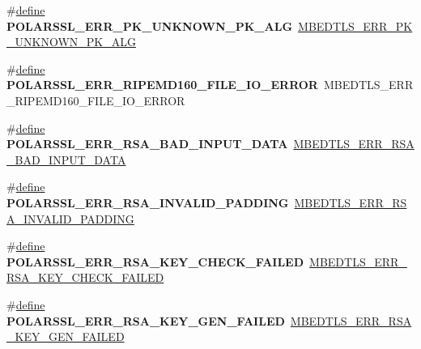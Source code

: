 \begin{DoxyCompactItemize}
\#\hyperlink{structdefine}{define} {\bfseries P\+O\+L\+A\+R\+S\+S\+L\+\_\+\+E\+R\+R\+\_\+\+P\+K\+\_\+\+U\+N\+K\+N\+O\+W\+N\+\_\+\+P\+K\+\_\+\+A\+LG}~\hyperlink{pk_8h_a877b66447bfa2cd49c1b99f1dc887568}{M\+B\+E\+D\+T\+L\+S\+\_\+\+E\+R\+R\+\_\+\+P\+K\+\_\+\+U\+N\+K\+N\+O\+W\+N\+\_\+\+P\+K\+\_\+\+A\+LG}
\item 
\mbox{\label{compat-1_83_8h_a72705f38972166097c2c3c8477baf950}} 
\#\hyperlink{structdefine}{define} {\bfseries P\+O\+L\+A\+R\+S\+S\+L\+\_\+\+E\+R\+R\+\_\+\+R\+I\+P\+E\+M\+D160\+\_\+\+F\+I\+L\+E\+\_\+\+I\+O\+\_\+\+E\+R\+R\+OR}~M\+B\+E\+D\+T\+L\+S\+\_\+\+E\+R\+R\+\_\+\+R\+I\+P\+E\+M\+D160\+\_\+\+F\+I\+L\+E\+\_\+\+I\+O\+\_\+\+E\+R\+R\+OR
\item 
\mbox{\label{compat-1_83_8h_aa30403951a6242045d0b47e2b51eccb0}} 
\#\hyperlink{structdefine}{define} {\bfseries P\+O\+L\+A\+R\+S\+S\+L\+\_\+\+E\+R\+R\+\_\+\+R\+S\+A\+\_\+\+B\+A\+D\+\_\+\+I\+N\+P\+U\+T\+\_\+\+D\+A\+TA}~\hyperlink{rsa_8h_abf2997e01281b898fd4594af0b7bfbb4}{M\+B\+E\+D\+T\+L\+S\+\_\+\+E\+R\+R\+\_\+\+R\+S\+A\+\_\+\+B\+A\+D\+\_\+\+I\+N\+P\+U\+T\+\_\+\+D\+A\+TA}
\item 
\mbox{\label{compat-1_83_8h_a2cab7b3c4ddc3bc02ffc59db19d0400f}} 
\#\hyperlink{structdefine}{define} {\bfseries P\+O\+L\+A\+R\+S\+S\+L\+\_\+\+E\+R\+R\+\_\+\+R\+S\+A\+\_\+\+I\+N\+V\+A\+L\+I\+D\+\_\+\+P\+A\+D\+D\+I\+NG}~\hyperlink{rsa_8h_add099b8887e9e2942fcc3bf1673f703d}{M\+B\+E\+D\+T\+L\+S\+\_\+\+E\+R\+R\+\_\+\+R\+S\+A\+\_\+\+I\+N\+V\+A\+L\+I\+D\+\_\+\+P\+A\+D\+D\+I\+NG}
\item 
\mbox{\label{compat-1_83_8h_a20c78c8fb43e505b891cf0ae19535316}} 
\#\hyperlink{structdefine}{define} {\bfseries P\+O\+L\+A\+R\+S\+S\+L\+\_\+\+E\+R\+R\+\_\+\+R\+S\+A\+\_\+\+K\+E\+Y\+\_\+\+C\+H\+E\+C\+K\+\_\+\+F\+A\+I\+L\+ED}~\hyperlink{rsa_8h_a75113c3b54138090c45a973b864200ad}{M\+B\+E\+D\+T\+L\+S\+\_\+\+E\+R\+R\+\_\+\+R\+S\+A\+\_\+\+K\+E\+Y\+\_\+\+C\+H\+E\+C\+K\+\_\+\+F\+A\+I\+L\+ED}
\item 
\mbox{\label{compat-1_83_8h_a1cd4e872914a9c350dee5a7deda8b51f}} 
\#\hyperlink{structdefine}{define} {\bfseries P\+O\+L\+A\+R\+S\+S\+L\+\_\+\+E\+R\+R\+\_\+\+R\+S\+A\+\_\+\+K\+E\+Y\+\_\+\+G\+E\+N\+\_\+\+F\+A\+I\+L\+ED}~\hyperlink{rsa_8h_ae334d56985d569186f5b5bb462cd6af2}{M\+B\+E\+D\+T\+L\+S\+\_\+\+E\+R\+R\+\_\+\+R\+S\+A\+\_\+\+K\+E\+Y\+\_\+\+G\+E\+N\+\_\+\+F\+A\+I\+L\+ED}

\end{DoxyCompactItemize}
